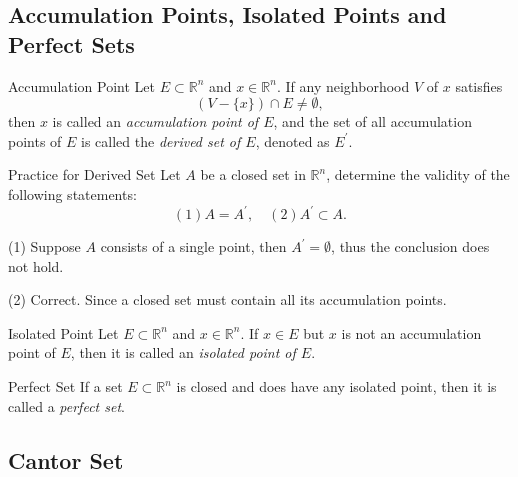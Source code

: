 \subsection{Accumulation Points, Isolated Points and Perfect Sets}

\begin{definition}{Accumulation Point}{}
  Let $E \subset \mathbb{R}^n$ and $x \in \mathbb{R}^n$.
  If any neighborhood $V$ of $x$ satisfies
  \begin{equation}
    (V - \{x\}) \cap E \neq \emptyset,
  \end{equation}
  then $x$ is called an \emph{accumulation point of $E$},
  and the set of all accumulation points of $E$ is called the \emph{derived set
    of $E$}, denoted as $E^{\prime}$.
\end{definition}

\begin{example}{Practice for Derived Set}{}
  Let $A$ be a closed set in $\mathbb{R}^n$,
  determine the validity of the following statements:
  \begin{equation}
    (1) A = A^{\prime}, \quad
    (2) A^{\prime} \subset A.
  \end{equation}
\end{example}

\begin{solution}
  (1) Suppose $A$ consists of a single point,
  then $A^{\prime} = \emptyset$, thus the conclusion does not hold.

  (2) Correct. Since a closed set must contain all its accumulation points.
\end{solution}

\begin{definition}{Isolated Point}{}
  Let $E \subset \mathbb{R}^n$ and $x \in \mathbb{R}^n$.
  If $x \in E$ but $x$ is not an accumulation point of $E$,
  then it is called an \emph{isolated point of $E$}.
\end{definition}

\begin{definition}{Perfect Set}{}
  If a set $E \subset \mathbb{R}^n$ is closed and does have any isolated point,
  then it is called a \emph{perfect set}.
\end{definition}



\subsection{Cantor Set}

